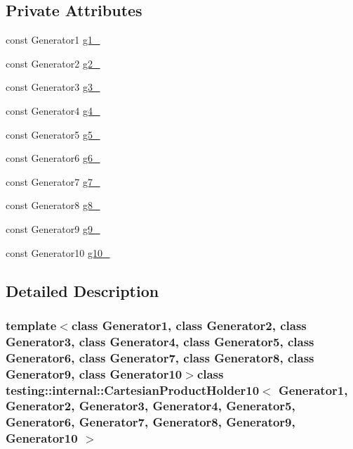\subsection*{\-Private \-Attributes}
\begin{DoxyCompactItemize}
\item 
const \-Generator1 \hyperlink{classtesting_1_1internal_1_1CartesianProductHolder10_a36a04c8f9e515291d6a093ab378084f7}{g1\-\_\-}
\item 
const \-Generator2 \hyperlink{classtesting_1_1internal_1_1CartesianProductHolder10_a6cfd9fa9a396d07747d5ebb1f05c7f22}{g2\-\_\-}
\item 
const \-Generator3 \hyperlink{classtesting_1_1internal_1_1CartesianProductHolder10_a79088ad1a5d8e0e316bd20057b9cfb3f}{g3\-\_\-}
\item 
const \-Generator4 \hyperlink{classtesting_1_1internal_1_1CartesianProductHolder10_afdb77af6126bc058715b1304ec0cc727}{g4\-\_\-}
\item 
const \-Generator5 \hyperlink{classtesting_1_1internal_1_1CartesianProductHolder10_ac153ca256cc6aabca132e9276e0b7e80}{g5\-\_\-}
\item 
const \-Generator6 \hyperlink{classtesting_1_1internal_1_1CartesianProductHolder10_ac5367ac6ea4b99933483d6181bace5c2}{g6\-\_\-}
\item 
const \-Generator7 \hyperlink{classtesting_1_1internal_1_1CartesianProductHolder10_afceade55d34273936f6cb3d7e4833d1b}{g7\-\_\-}
\item 
const \-Generator8 \hyperlink{classtesting_1_1internal_1_1CartesianProductHolder10_a33efc612232313b29b814adcffee62e6}{g8\-\_\-}
\item 
const \-Generator9 \hyperlink{classtesting_1_1internal_1_1CartesianProductHolder10_ab18e76dd6bb0c7782e0fc18c04b82063}{g9\-\_\-}
\item 
const \-Generator10 \hyperlink{classtesting_1_1internal_1_1CartesianProductHolder10_ae3cdbf0652865e43facfbb95e0686471}{g10\-\_\-}
\end{DoxyCompactItemize}


\subsection{\-Detailed \-Description}
\subsubsection*{template$<$class Generator1, class Generator2, class Generator3, class Generator4, class Generator5, class Generator6, class Generator7, class Generator8, class Generator9, class Generator10$>$class testing\-::internal\-::\-Cartesian\-Product\-Holder10$<$ Generator1, Generator2, Generator3, Generator4, Generator5, Generator6, Generator7, Generator8, Generator9, Generator10 $>$}



